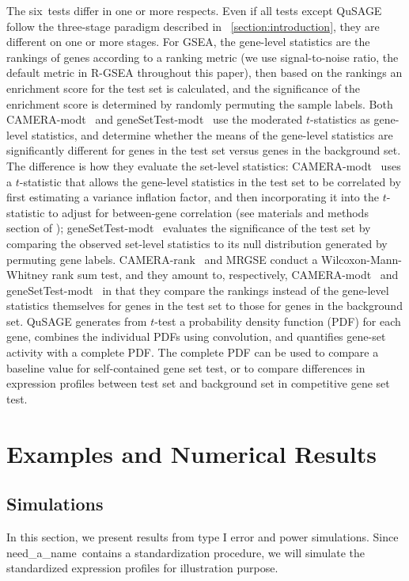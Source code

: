 \documentclass[useAMS,usenatbib, galley]{biom}
\newcommand{\OurMethod}{need\_a\_name}
\newcommand{\HowmanyTest}{six}
\newcommand{\CMR}{CAMERA-rank}
\newcommand{\CMT}{CAMERA-modt}
\newcommand{\gent}{geneSetTest-modt}
\begin{document}
	The \HowmanyTest~tests differ in one or more respects. Even if all tests except QuSAGE follow the three-stage paradigm described in ~\ref{section:introduction}, they are different on one or more stages. For GSEA, the gene-level statistics are the rankings of genes according to a ranking metric (we use signal-to-noise ratio, the default metric in R-GSEA throughout this paper), then based on the rankings an enrichment score for the test set is calculated, and the significance of the enrichment score is determined by randomly permuting the sample labels. Both \CMT~ and \gent~ use the moderated $t$-statistics \citep{Smyth2004moderated} as gene-level statistics, and determine whether the means of the gene-level statistics are significantly different for genes in the test set versus genes in the background set. The difference is how they evaluate the set-level statistics: \CMT~ uses a $t$-statistic that allows the gene-level statistics in the test set to be correlated by first estimating a variance inflation factor, and then incorporating it into the $t$-statistic to adjust for between-gene correlation (see materials and methods section of \cite{wu2012camera}); \gent~ evaluates the significance of the test set by comparing the observed set-level statistics to its null distribution generated by permuting gene labels. \CMR~ and MRGSE conduct a Wilcoxon-Mann-Whitney rank sum test, and they amount to, respectively,  \CMT~ and \gent~ in that they compare the rankings instead of the gene-level statistics themselves for genes in the test set to those for genes in the background set. QuSAGE generates from $t$-test a probability density function (PDF) for each gene, combines the individual PDFs using convolution, and quantifies gene-set activity with a complete PDF. The complete PDF can be used to compare a baseline value for self-contained gene set test, or to compare differences in expression profiles between test set and background set in competitive gene set test.  
	
	
	
	\section{Examples and Numerical Results}\label{section:results}
	
	\subsection{Simulations}\label{subsection:simulation}
	In this section, we present results from type I error and power simulations. Since \OurMethod~contains a standardization procedure, we will simulate the standardized expression profiles for illustration purpose. 
	
\end{document}
